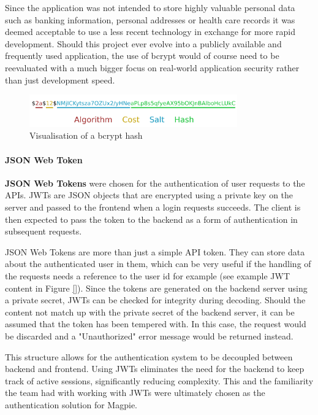 Since the application was not intended to store highly valuable personal data
such as banking information, personal addresses or health care records it was
deemed acceptable to use a less recent technology in exchange for more rapid
development. Should this project ever evolve into a publicly available and
frequently used application, the use of bcrypt would of course need to be
reevaluated with a much bigger focus on real-world application security rather
than just development speed.

\begin{figure}[H]
  \centering{}
  \includegraphics[width=0.8\textwidth]{./images/bcrypt_hash.png}
  \caption{Visualisation of a bcrypt hash}
  \label{fig:bcrypt_hash}
\end{figure}

\paragraph{JSON Web Token} \label{jwt}
\textbf{JSON Web Tokens} were chosen for the authentication of user requests to
the APIs. JWTs are JSON objects that are encrypted using a private key on the
server and passed to the frontend when a login requests succeeds. The client is
then expected to pass the token to the backend as a form of authentication in
subsequent requests.

JSON Web Tokens are more than just a simple API token. They can store data about
the authenticated user in them, which can be very useful if the handling of the
requests needs a reference to the user id for example (see example JWT content
in Figure \ref{}). Since the tokens are generated on the backend server using a
private secret, JWTs can be checked for integrity during decoding. Should the
content not match up with the private secret of the backend server, it can be
assumed that the token has been tempered with. In this case, the request would
be discarded and a "Unauthorized" error message would be returned instead.

This structure allows for the authentication system to be decoupled between
backend and frontend. Using JWTs eliminates the need for the backend to keep
track of active sessions, significantly reducing complexity. This and the
familiarity the team had with working with JWTs were ultimately chosen as the
authentication solution for Magpie.

